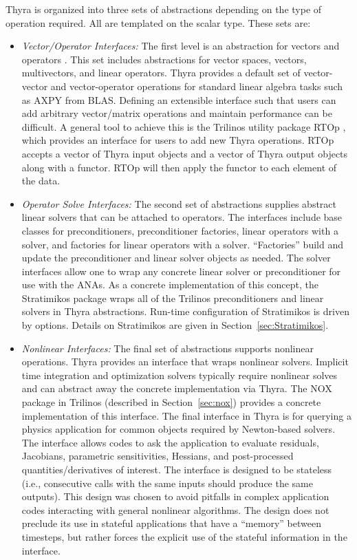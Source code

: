 Thyra is organized into three sets of abstractions depending on the type of operation required. All are templated on the scalar type. These sets are:
\begin{itemize}
\item \emph{Vector/Operator Interfaces:} The first level is an abstraction for vectors and operators \cite{Bartlett2007}. This set includes abstractions for vector spaces, vectors, multivectors, and linear operators. Thyra provides a default set of vector-vector and vector-operator operations for standard linear algebra tasks such as AXPY from BLAS. Defining an extensible interface such that users can add arbitrary vector/matrix operations and maintain performance can be difficult. A general tool to achieve this is the Trilinos utility package RTOp \cite{rtop}, which provides an interface for users to add new Thyra operations. RTOp accepts a vector of Thyra input objects and a vector of Thyra output objects along with a functor. RTOp will then apply the functor to each element of the data.

\item \emph{Operator Solve Interfaces:} The second set of abstractions supplies abstract linear solvers that can be attached to operators. The interfaces include base classes for preconditioners, preconditioner factories, linear operators with a solver, and factories for linear operators with a solver. ``Factories'' build and update the preconditioner and linear solver objects as needed. The solver interfaces allow one to wrap any concrete linear solver or preconditioner for use with the ANAs. As a concrete implementation of this concept, the Stratimikos package wraps all of the Trilinos preconditioners and linear solvers in Thyra abstractions. Run-time configuration of Stratimikos is driven by  options.
Details on Stratimikos are given in Section~\ref{sec:Stratimikos}.

\item \emph{Nonlinear Interfaces:} The final set of abstractions supports nonlinear operations. Thyra provides an interface that wraps nonlinear solvers. Implicit time integration and optimization solvers typically require nonlinear solves and can abstract away the concrete implementation via Thyra. The NOX package in Trilinos (described in Section~\ref{sec:nox}) provides a concrete implementation of this interface. The final interface in Thyra is for querying a physics application for common objects required by Newton-based solvers. The  interface allows codes to ask the application to evaluate residuals, Jacobians, parametric sensitivities, Hessians, and post-processed quantities/derivatives of interest. The interface is designed to be stateless (i.e., consecutive calls with the same inputs should produce the same outputs). This design was chosen to avoid pitfalls in complex application codes interacting with general nonlinear algorithms. The design does not preclude its use in stateful applications that have a ``memory'' between timesteps, but rather forces the explicit use of the stateful information in the interface.
\end{itemize}


